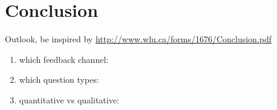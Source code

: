 \section{Conclusion}
\label{sec:conclusion}

	Outlook, be inspired by \url{http://www.wlu.ca/forms/1676/Conclusion.pdf}

		\begin{enumerate}
		\item which feedback channel:
		\item which question types: 
		\item quantitative vs qualitative: 
		\end{enumerate}


